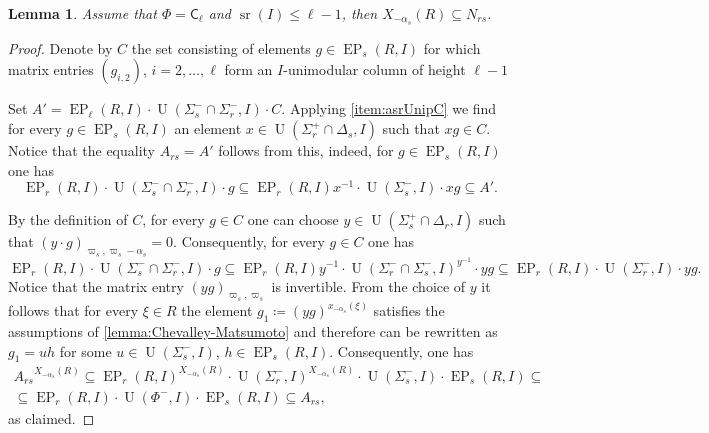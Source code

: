 \documentclass[11pt]{amsart}
\theoremstyle{plain}
\numberwithin{equation}{section}
\newtheorem{lemma}{Lemma}
\numberwithin{lemma}{section}
\theoremstyle{definition}
\theoremstyle{remark}
\DeclareMathOperator{\EP}{EP}
\DeclareMathOperator{\U}{U}
\DeclareMathOperator{\sr}{sr}
\newcommand{\rC}{\mathsf{C}}
\begin{document}
\begin{lemma}\label{lemma:DVST}
Assume that $\Phi=\rC_\ell$ and $\sr(I) \leq \ell-1$, then $X_{-\alpha_s}(R) \subseteq N_{rs}$.
\end{lemma}
\begin{proof}
Denote by $C$ the set consisting of elements $g \in \EP_s(R, I)$ for which matrix entries $(g_{i, 2})$, $i=2, \ldots, \ell$ form an $I$-unimodular column of height $\ell-1$

Set $A' = \EP_\ell(R, I) \cdot \U(\Sigma_s^- \cap \Sigma_r^-, I) \cdot C$.
Applying \cref{item:asrUnipC} we find for every $g \in \EP_s(R, I)$ an element $x \in \U(\Sigma_r^+ \cap \Delta_s, I)$ such that $xg \in C$.  
Notice that the equality $A_{rs} = A'$ follows from this, indeed, for $g\in \EP_s(R, I)$ one has
\begin{equation*} \EP_r(R, I) \cdot \U(\Sigma_s^- \cap \Sigma_r^-, I) \cdot g \subseteq 
 \EP_r(R, I)x^{-1}  \cdot \U(\Sigma_s^-, I) \cdot xg \subseteq A'. \end{equation*}

By the definition of $C$, for every $g \in C$ one can choose $y \in \U(\Sigma_s^+ \cap \Delta_r, I)$ such that $(y \cdot g)_{\varpi_s, \varpi_s - \alpha_s} = 0$.
Consequently, for every $g\in C$ one has
\[
 \EP_r(R, I) \cdot \U(\Sigma_s^- \cap \Sigma_r^-, I) \cdot g \subseteq \EP_r(R, I) y^{-1} \cdot \U(\Sigma_r^-\cap \Sigma_s^-, I)^{y^{-1}} \cdot y g
  \subseteq \EP_r(R, I) \cdot \U(\Sigma_r^-, I) \cdot y g.
\]
Notice that the matrix entry $(yg)_{\varpi_s, \varpi_s}$ is invertible.
From the choice of $y$ it follows that for every $\xi\in R$ the element $g_1 \coloneqq (yg)^{x_{-\alpha_s}(\xi)}$
satisfies the assumptions of \cref{lemma:Chevalley-Matsumoto} and therefore can be rewritten as $g_1 = uh$ for some $u \in \U(\Sigma_s^-, I)$, $h \in \EP_s(R, I)$.
Consequently, one has
\begin{multline*} {A_{rs}}^{X_{-\alpha_{s}}(R)} \subseteq \EP_r(R, I)^{X_{-\alpha_{s}}(R)} \cdot \U(\Sigma_r^-, I)^{X_{-\alpha_{s}}(R)} \cdot \U(\Sigma_s^-, I) \cdot \EP_s(R, I) \subseteq \\
\subseteq \EP_r(R, I) \cdot \U(\Phi^-, I) \cdot \EP_s(R, I) \subseteq A_{rs}, \end{multline*}
as claimed.
\end{proof}
\end{document}
